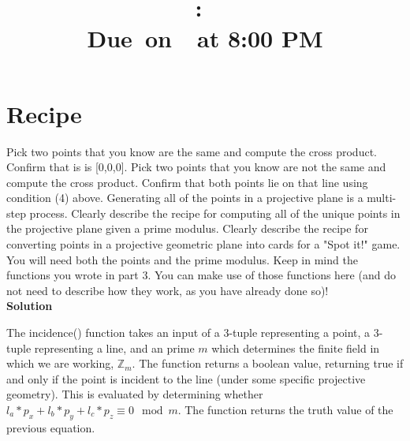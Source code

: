 \documentclass{article}
\title{
    \vspace{2in}
    \textmd{\textbf{\hmwkClass:\ \hmwkTitle}}\\
    \normalsize\vspace{0.1in}\small{Due\ on\ \hmwkDueDate\ at 8:00 PM}\\
    \vspace{0.1in}\large{\textit{\hmwkClassInstructor}}
    \vspace{3in}
}
\author{\hmwkAuthorName}
\date{}
\begin{document}
\maketitle
\pagebreak

\section{Recipe}
   Pick two points that you know are the same and compute the cross product. Confirm that is is [0,0,0]. Pick two points that you know are not the same and compute the cross product. Confirm that both points lie on that line using condition (4) above.
   Generating all of the points in a projective plane is a multi-step process. Clearly describe the recipe for computing all of the unique points in the projective plane given a prime modulus.
   Clearly describe the recipe for converting points in a projective geometric plane into cards for a "Spot it!" game. You will need both the points and the prime modulus. Keep in mind the functions you wrote in part 3. You can make use of those functions here (and do not need to describe how they work, as you have already done so)!
   \\
   
   \textbf{Solution}
    
    The incidence() function takes an input of a 3-tuple representing a point, a 3-tuple representing a line, and an prime $m$ which determines the finite field in which we are working, $\mathbb{Z}_m$. The function returns a boolean value, returning true if and only if the point is incident to the line (under some specific projective geometry). This is evaluated by determining whether $l_a*p_x + l_b*p_y + l_c*p_z \equiv 0 \mod m$. The function returns the truth value of the previous equation. \\
    
\end{document}
